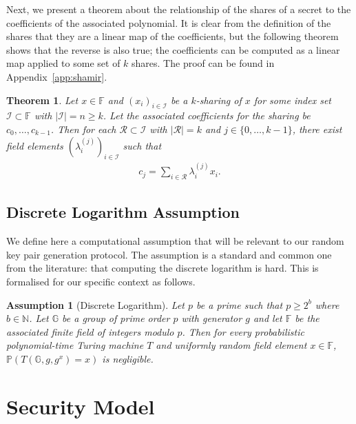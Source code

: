 \documentclass{article}
\newtheorem{theorem}{Theorem}
\newtheorem{assumption}{Assumption}
\theoremstyle{remark}
\newcommand{\N}{\mathbb{N}}
\newcommand{\F}{\mathbb{F}}
\newcommand{\G}{\mathbb{G}}
\renewcommand{\P}{\mathbb{P}}
\begin{document}
Next, we present a theorem about the relationship of the shares of a secret to
the coefficients of the associated polynomial. It is clear from the definition
of the shares that they are a linear map of the coefficients, but the following
theorem shows that the reverse is also true; the coefficients can be computed
as a linear map applied to some set of $k$ shares. The proof can be found in
Appendix~\ref{app:shamir}.

\begin{theorem}\label{thm:shareCoeffLO}
	Let $x \in \F$ and ${(x_i)}_{i \in \mathcal{I}}$ be a $k$-sharing of $x$
	for some index set $\mathcal{I} \subset \F$ with $|\mathcal{I}| = n \ge k$.
	Let the associated coefficients for the sharing be $c_0, \ldots, c_{k-1}$.
	Then for each $\mathcal{R} \subset \mathcal{I}$ with $|\mathcal{R}| = k$
	and $j \in \{0, \ldots, k-1\}$, there exist field elements
	${(\lambda_i^{(j)})}_{i \in \mathcal{I}}$ such that
	\begin{align*}
		c_j = \sum_{i \in \mathcal{R}} \lambda_i^{(j)} x_i.
	\end{align*}
\end{theorem}

\subsection{Discrete Logarithm Assumption}

We define here a computational assumption that will be relevant to our random
key pair generation protocol. The assumption is a standard and common one from
the literature: that computing the discrete logarithm is hard. This is
formalised for our specific context as follows.

\begin{assumption}[Discrete Logarithm]\label{ass:dlog}
	Let $p$ be a prime such that $p \ge 2^b$ where $b \in \N$. Let $\G$ be a
	group of prime order $p$ with generator $g$ and let $\F$ be the associated
	finite field of integers modulo $p$. Then for every probabilistic
	polynomial-time Turing machine $T$ and uniformly random field element $x
	\in \F$, $\P(T(\mathbb{G}, g, g^x) = x)$ is negligible.
\end{assumption}

\section{Security Model}

\newcommand{\exec}[4]{\textup{\texttt{EXEC}}_{#1, #2} (#3, #4)}
\newcommand{\execD}{\exec{\proto}{\mathcal{A}}{x}{z}}
\end{document}
